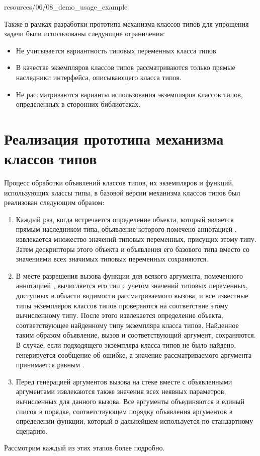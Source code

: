 
{resources/06/08_demo_usage_example}

Также в рамках разработки прототипа механизма классов типов для упрощения задачи были использованы следующие ограничения:
\begin{itemize}
    \item Не учитывается вариантность типовых переменных класса типов.
    \item В качестве экземпляров классов типов рассматриваются только прямые наследники интерфейса, описывающего класса типов.
    \item Не рассматриваются варианты использования экземпляров классов типов, определенных в сторонних библиотеках.
\end{itemize}

\section{Реализация прототипа механизма классов типов}

Процесс обработки объявлений классов типов, их экземпляров и функций, использующих классы типы, в базовой версии механизма классов типов был реализован следующим образом:  
\begin{enumerate}
    \item Каждый раз, когда встречается определение объекта, который является прямым наследником типа, объявление которого помечено аннотацией , извлекается множество значений типовых переменных, присущих этому типу. Затем дескрипторы этого объекта и объявления его базового типа вместо со значениями всех значимых типовых переменных сохраняются. 
    \item В месте разрешения вызова функции для всякого аргумента, помеченного аннотацией , вычисляется его тип с учетом значений типовых переменных, доступных в области видимости рассматриваемого вызова, и все известные типы экземпляров классов типов проверяются на соответствие этому вычисленному типу. После этого извлекается определение объекта, соответствующее найденному типу экземпляра класса типов. Найденное таким образом объявление, вызов и соответствующий аргумент, сохраняются. В случае, если подходящего экземпляра класса типов не было найдено, генерируется сообщение об ошибке, а значение рассматриваемого аргумента принимается равным . 
    \item Перед генерацией аргументов вызова на стеке вместе с объявленными аргументами извлекаются также значения всех неявных параметров, вычисленных для данного вызова. Все аргументы объединяются в единый список в порядке, соответствующем порядку объявления аргументов в определении функции, который в дальнейшем используется по стандартному сценарию.    
\end{enumerate}   
Рассмотрим каждый из этих этапов более подробно.

